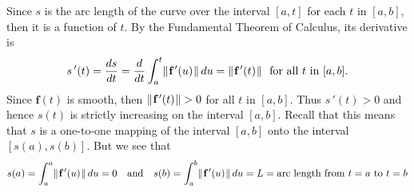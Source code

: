 Since $s$ is the arc length of the curve over the interval $[a,t]$ for each $t$ in $[a,b]$, then it is a function
of $t$. By the Fundamental Theorem of Calculus, its derivative is
\begin{displaymath}
 s\,'(t) = \dfrac{ds}{dt} = \dfrac{d}{dt} \int_{a}^{t} \lVert\mspace{1mu}\textbf{f}\,'(u)\mspace{1mu}\rVert\,du =
 \lVert\mspace{1mu}\textbf{f}\,'(t)\mspace{1mu}\rVert \text{~~for all $t$ in $[a,b]$}.
\end{displaymath}
Since $\textbf{f}(t)$ is smooth, then $\lVert\mspace{1mu}\textbf{f}\,'(t)\mspace{1mu}\rVert > 0$ for all $t$ in $[a,b]$. Thus $s\,'(t) > 0$
and hence $s(t)$ is strictly increasing on the interval $[a,b]$. Recall that this means that $s$ is a one-to-one mapping
of the interval $[a,b]$ onto the interval $[s(a),s(b)]$. But we see that
\begin{displaymath}
 s(a) = \int_{a}^{a} \lVert\mspace{1mu}\textbf{f}\,'(u)\mspace{1mu}\rVert\,du = 0 \quad \text{and} \quad
 s(b) = \int_{a}^{b} \lVert\mspace{1mu}\textbf{f}\,'(u)\mspace{1mu}\rVert\,du = L = \text{arc length from $t = a$ to $t = b$}
\end{displaymath}

